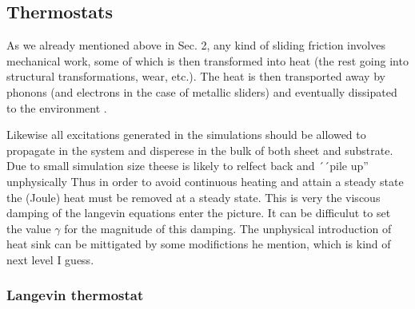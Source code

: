 

\subsection{Thermostats}

As we already mentioned above in Sec. 2, any kind of sliding friction involves mechanical work, some of which is then transformed into heat (the rest going into structural transformations, wear, etc.). The heat is then transported away by phonons (and electrons in the case of metallic sliders) and eventually dissipated to the environment \cite{Manini_2016}.



Likewise all excitations generated in the simulations should be allowed to propagate in the system and disperese in the bulk of both sheet and substrate. Due to small simulation size theese is likely to relfect back and ´´pile up'' unphysically Thus in order to avoid continuous heating and attain a steady state the (Joule) heat must be removed at a steady state. This is very the viscous damping of the langevin equations enter the picture. It can be difficulut to set the value $\gamma$ for the magnitude of this damping. The unphysical introduction of heat sink can be mittigated by some modifictions he mention, which is kind of next level I guess. 


\subsubsection{Langevin thermostat} \label{sec:langevin}


